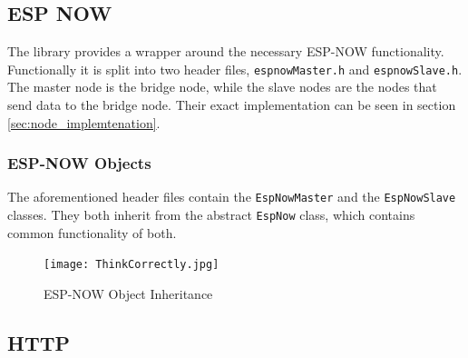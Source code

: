     \subsection{ESP NOW} \label{sec:farilib_espnow}
    The library provides a wrapper around the necessary ESP-NOW functionality.
    Functionally it is split into two header files, \texttt{espnowMaster.h} and 
    \texttt{espnowSlave.h}. The master node is the bridge node, while the slave
    nodes are the nodes that send data to the bridge node. Their exact implementation
    can be seen in section \ref{sec:node_implemtenation}.
        \subsubsection{ESP-NOW Objects}
        The aforementioned header files contain the \texttt{EspNowMaster} and the
        \texttt{EspNowSlave} classes. They both inherit from the abstract 
        \texttt{EspNow} class, which contains common functionality of both.
        \begin{figure}[H]
            \centering
            \texttt{[image: ThinkCorrectly.jpg]}
            \caption{ESP-NOW Object Inheritance}
        \end{figure}

    \subsection{HTTP} \label{sec:farilib_http}